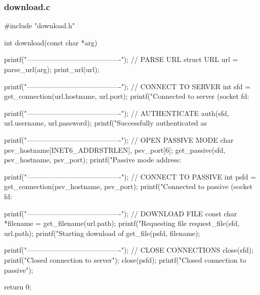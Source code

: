 \documentclass[11pt,a4paper]{article}
\begin{document}
\subsubsection{download.c}
\begin{c-darktheme}
    #include "download.h"

    int download(const char *arg)
    {
        printf("----------------------------------------\n"); // PARSE URL
        struct URL url = parse_url(arg);
        print_url(url);
    
        printf("----------------------------------------\n"); // CONNECT TO SERVER
        int sfd = get_connection(url.hostname, url.port);
        printf("Connected to server (socket fd: %
    
        printf("----------------------------------------\n"); // AUTHENTICATE
        auth(sfd, url.username, url.password);
        printf("Successfully authenticated as %
    
        printf("----------------------------------------\n"); // OPEN PASSIVE MODE
        char psv_hostname[INET6_ADDRSTRLEN], psv_port[6];
        get_passive(sfd, psv_hostname, psv_port);
        printf("Passive mode address: %
    
        printf("----------------------------------------\n"); // CONNECT TO PASSIVE
        int psfd = get_connection(psv_hostname, psv_port);
        printf("Connected to passive (socket fd: %
    
        printf("----------------------------------------\n"); // DOWNLOAD FILE
        const char *filename = get_filename(url.path);
        printf("Requesting file %
        request_file(sfd, url.path);
        printf("Starting download of %
        get_file(psfd, filename);
    
        printf("----------------------------------------\n"); // CLOSE CONNECTIONS
        close(sfd);
        printf("Closed connection to server\n");
        close(psfd);
        printf("Closed connection to passive\n");
    
        return 0;
    }
    
\end{c-darktheme}
\end{document}
